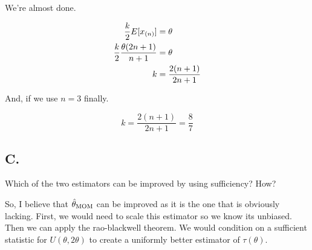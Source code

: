 We're almost done. 

\begin{align*}
	\frac{k}{2}E[x_{(n)}] &= \theta \\
	\frac{k}{2} \frac{\theta (2n+1)}{n+1} &= \theta \\
	k &= \frac{2(n+1)}{2n+1}
\end{align*}

And, if we use $n=3$ finally. 

\[
	k = \frac{2(n+1)}{2n+1} = \frac{8}{7}
\]

\subsection*{C.}

Which of the two estimators can be improved by using sufficiency? How?

So, I believe that $\hat{\theta}_{\text{MOM}}$ can be improved as it is the one that is obviously lacking. First, we would need to scale this estimator so we know its unbiased. Then we can apply the rao-blackwell theorem. We would condition on a sufficient statistic for $U(\theta, 2\theta)$ to create a uniformly better estimator of $\tau(\theta)$. 
